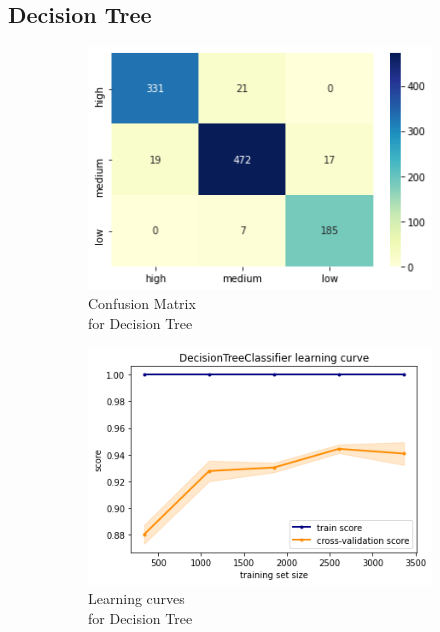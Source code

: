 \subsection{Decision Tree}
\begin{figure}[h!]
     \captionsetup{justification=centering}             
     \centering
     \begin{subfigure}{0.49\textwidth}
         \centering
         \captionsetup{type=figure}
         \includegraphics[width=\textwidth]{img/classification/dt_confusion.png}
         \caption{Confusion Matrix \\ for Decision Tree}
         \label{fig:dt_confusion}
     \end{subfigure}
     \begin{subfigure}{0.49\textwidth}
         \centering
         \includegraphics[width=\textwidth]{img/classification/dt_lc.png}
         \caption{Learning curves \\ for Decision Tree}
         \label{fig:dt_lc}
     \end{subfigure}
     \caption{}
    \label{fig:dt}
\end{figure}

